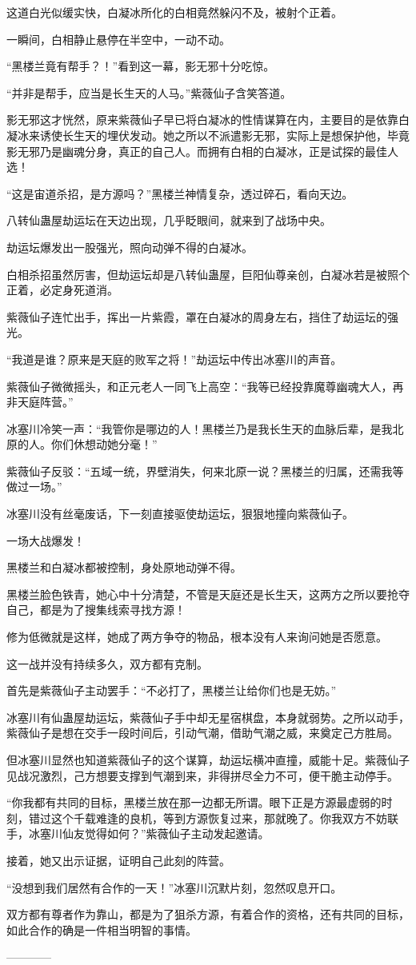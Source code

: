 \begin{this_body}
这道白光似缓实快，白凝冰所化的白相竟然躲闪不及，被射个正着。

一瞬间，白相静止悬停在半空中，一动不动。

“黑楼兰竟有帮手？！”看到这一幕，影无邪十分吃惊。

“并非是帮手，应当是长生天的人马。”紫薇仙子含笑答道。

影无邪这才恍然，原来紫薇仙子早已将白凝冰的性情谋算在内，主要目的是依靠白凝冰来诱使长生天的埋伏发动。她之所以不派遣影无邪，实际上是想保护他，毕竟影无邪乃是幽魂分身，真正的自己人。而拥有白相的白凝冰，正是试探的最佳人选！

“这是宙道杀招，是方源吗？”黑楼兰神情复杂，透过碎石，看向天边。

八转仙蛊屋劫运坛在天边出现，几乎眨眼间，就来到了战场中央。

劫运坛爆发出一股强光，照向动弹不得的白凝冰。

白相杀招虽然厉害，但劫运坛却是八转仙蛊屋，巨阳仙尊亲创，白凝冰若是被照个正着，必定身死道消。

紫薇仙子连忙出手，挥出一片紫霞，罩在白凝冰的周身左右，挡住了劫运坛的强光。

“我道是谁？原来是天庭的败军之将！”劫运坛中传出冰塞川的声音。

紫薇仙子微微摇头，和正元老人一同飞上高空：“我等已经投靠魔尊幽魂大人，再非天庭阵营。”

冰塞川冷笑一声：“我管你是哪边的人！黑楼兰乃是我长生天的血脉后辈，是我北原的人。你们休想动她分毫！”

紫薇仙子反驳：“五域一统，界壁消失，何来北原一说？黑楼兰的归属，还需我等做过一场。”

冰塞川没有丝毫废话，下一刻直接驱使劫运坛，狠狠地撞向紫薇仙子。

一场大战爆发！

黑楼兰和白凝冰都被控制，身处原地动弹不得。

黑楼兰脸色铁青，她心中十分清楚，不管是天庭还是长生天，这两方之所以要抢夺自己，都是为了搜集线索寻找方源！

修为低微就是这样，她成了两方争夺的物品，根本没有人来询问她是否愿意。

这一战并没有持续多久，双方都有克制。

首先是紫薇仙子主动罢手：“不必打了，黑楼兰让给你们也是无妨。”

冰塞川有仙蛊屋劫运坛，紫薇仙子手中却无星宿棋盘，本身就弱势。之所以动手，紫薇仙子是想在交手一段时间后，引动气潮，借助气潮之威，来奠定己方胜局。

但冰塞川显然也知道紫薇仙子的这个谋算，劫运坛横冲直撞，威能十足。紫薇仙子见战况激烈，己方想要支撑到气潮到来，非得拼尽全力不可，便干脆主动停手。

“你我都有共同的目标，黑楼兰放在那一边都无所谓。眼下正是方源最虚弱的时刻，错过这个千载难逢的良机，等到方源恢复过来，那就晚了。你我双方不妨联手，冰塞川仙友觉得如何？”紫薇仙子主动发起邀请。

接着，她又出示证据，证明自己此刻的阵营。

“没想到我们居然有合作的一天！”冰塞川沉默片刻，忽然叹息开口。

双方都有尊者作为靠山，都是为了狙杀方源，有着合作的资格，还有共同的目标，如此合作的确是一件相当明智的事情。

------------

\end{this_body}

